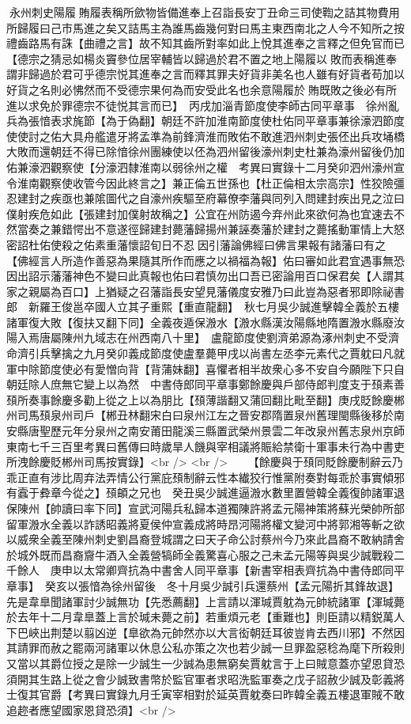 永州刺史陽履賄履表稱所歛物皆備進奉上召詣長安丁丑命三司使鞫之詰其物費用所歸履曰己市馬進之矣又詰馬主為誰馬齒幾何對曰馬主東西南北之人今不知所之按禮齒路馬有誅【曲禮之言】故不知其齒所對率如此上悅其進奉之言釋之但免官而已【德宗之猜忌如楊炎竇參位居宰輔皆以歸過於君不置之地上陽履以敗而表稱進奉謂非歸過於君可乎德宗悦其進奉之言而釋其罪夫好貨非美名也人雖有好貨者苟加以好貨之名則必怫然而不受德宗果何為而安受此名也余意陽履於賄既敗之後必有所進以求免於罪德宗不徒悦其言而已】　丙戌加淄青節度使李師古同平章事　徐州亂兵為張愔表求旄節【為于偽翻】朝廷不許加淮南節度使杜佑同平章事兼徐濠泗節度使使討之佑大具舟艦遣牙將孟準為前鋒濟淮而敗佑不敢進泗州刺史張伾出兵攻埇橋大敗而還朝廷不得已除愔徐州團練使以伾為泗州留後濠州刺史杜兼為濠州留後仍加佑兼濠泗觀察使【分濠泗隸淮南以弱徐州之權　考異曰實錄十二月癸卯泗州濠州宣令淮南觀察使收管今因此終言之】兼正倫五世孫也【杜正倫相太宗高宗】性狡險彊忍建封之疾亟也兼隂圖代之自濠州疾驅至府幕僚李藩與同列入問建封疾出見之泣曰僕射疾危如此【張建封加僕射故稱之】公宜在州防遏今弃州此來欲何為也宜速去不然當奏之兼錯愕出不意遂徑歸建封薨藩歸揚州兼誣奏藩於建封之薨搖動軍情上大怒密詔杜佑使殺之佑素重藩懷詔旬日不忍因引藩論佛經曰佛言果報有諸藩曰有之【佛經言人所造作善惡為果隨其所作而應之以禍福為報】佑曰審如此君宜遇事無恐因出詔示藩藩神色不變曰此真報也佑曰君慎勿出口吾已密論用百口保君矣【人謂其家之親屬為百口】上猶疑之召藩詣長安望見藩儀度安雅乃曰此豈為惡者邪即除祕書郎　新羅王俊邕卒國人立其子重熙【重直龍翻】　秋七月吳少誠進擊韓全義於五樓諸軍復大敗【復扶又翻下同】全義夜遁保溵水【溵水縣漢汝陽縣地隋置溵水縣廢汝陽入焉唐屬陳州九域志在州西南八十里】　盧龍節度使劉濟弟源為涿州刺史不受濟命濟引兵擊擒之九月癸卯義成節度使盧羣薨甲戌以尚書左丞李元素代之賈躭曰凡就軍中除節度使必有愛憎向背【背蒲妹翻】喜懼者相半故衆心多不安自今願陛下只自朝廷除人庶無它變上以為然　中書侍郎同平章事鄭餘慶與戶部侍郎判度支于䪹素善䪹所奏事餘慶多勸上從之上以為朋比【䪹薄諧翻又蒲回翻比毗至翻】庚戌貶餘慶郴州司馬䪹泉州司戶【郴丑林翻宋白曰泉州江左之晉安郡隋置泉州舊理閩縣後移於南安縣唐聖歷元年分泉州之南安莆田龍溪三縣置武榮州景雲二年改泉州舊志泉州京師東南七千三百里考異曰舊傳曰時歲旱人饑與宰相議將賑給禁衛十軍事未行為中書吏所洩餘慶貶郴州司馬按實錄】<br />
<br />
　　【餘慶與于䪹同貶餘慶制辭云乃乖正直有涉比周弃法弄情公行黨庇䪹制辭云性本纎狡行惟黨附奏對每乖於事實傾邪有蠧于彜章今從之】䪹頔之兄也　癸丑吳少誠進逼溵水數里置營韓全義復帥諸軍退保陳州【帥讀曰率下同】宣武河陽兵私歸本道獨陳許將孟元陽神策將蘇光榮帥所部留軍溵水全義以詐誘昭義將夏侯仲宣義成將時昂河陽將權文變河中將郭湘等斬之欲以威衆全義至陳州刺史劉昌裔登城謂之曰天子命公討蔡州今乃來此昌裔不敢納請舍於城外既而昌裔齎牛酒入全義營犒師全義驚喜心服之己未孟元陽等與吳少誠戰殺二千餘人　庚申以太常卿齊抗為中書舍人同平章事【新書宰相表齊抗為中書侍郎同平章事】　癸亥以張愔為徐州留後　冬十月吳少誠引兵還蔡州【孟元陽折其鋒故退】先是韋臯聞諸軍討少誠無功【先悉薦翻】上言請以渾瑊賈躭為元帥統諸軍【渾瑊薨於去年十二月韋臯蓋上言於瑊未薨之前】若重煩元老【重難也】則臣請以精鋭萬人下巴峽出荆楚以翦凶逆【臯欲為元帥然亦以大言衒朝廷耳彼豈肯去西川邪】不然因其請罪而赦之罷兩河諸軍以休息公私亦策之次也若少誠一旦罪盈惡稔為麾下所殺則又當以其爵位授之是除一少誠生一少誠為患無窮矣賈躭言于上曰賊意蓋亦望恩貸恐須開其生路上從之會少誠致書幣於監官軍者求昭洗監軍奏之戊子詔赦少誠及彰義將士復其官爵【考異曰實錄九月壬寅宰相對於延英賈躭奏曰昨韓全義五樓退軍賊不敢追趂者應望國家恩貸恐須】<br />
